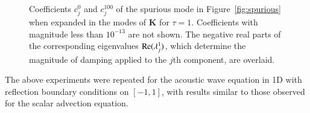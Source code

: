 \documentclass[preprint,10pt]{elsarticle}
\newcommand{\note}[1]{{\color{blue}#1}}
\begin{document}
\begin{figure}
\centering
{}
\hspace{1em}
\caption{Coefficients $c^0_j$ and $c^{100}_j$ of the spurious mode in Figure~\ref{fig:spurious} when expanded in the modes of $\bm{K}$ for $\tau=1$.  Coefficients with magnitude less than $10^{-13}$ are not shown.   The negative real parts of the corresponding eigenvalues ${\rm Re}(\lambda^1_j)$, which determine the magnitude of damping applied to the $j$th component, are overlaid. }
\label{fig:cmodes}
\end{figure}

The above experiments were repeated for the acoustic wave equation in 1D with reflection boundary conditions on $[-1,1]$, with results similar to those observed for the scalar advection equation.   %

\end{document}
